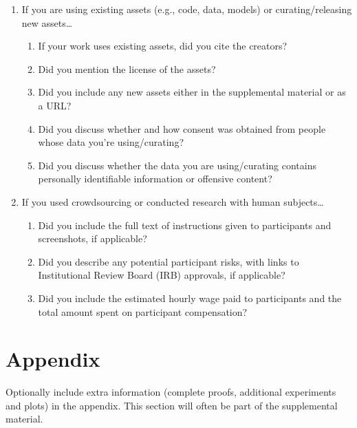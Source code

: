 \documentclass{article}
\begin{document}
\begin{enumerate}
\item If you are using existing assets (e.g., code, data, models) or
    curating/releasing new assets\ldots
\begin{enumerate}
  \item If your work uses existing assets, did you cite the creators?
    \answerTODO{}
  \item Did you mention the license of the assets?
    \answerTODO{}
  \item Did you include any new assets either in the supplemental material or
      as a URL\@?
    \answerTODO{}
  \item Did you discuss whether and how consent was obtained from people whose
      data you're using/curating?
    \answerTODO{}
  \item Did you discuss whether the data you are using/curating contains
      personally identifiable information or offensive content?
    \answerTODO{}
\end{enumerate}

\item If you used crowdsourcing or conducted research with human
    subjects\ldots
\begin{enumerate}
  \item Did you include the full text of instructions given to participants
      and screenshots, if applicable?
    \answerTODO{}
  \item Did you describe any potential participant risks, with links to
      Institutional Review Board (IRB) approvals, if applicable?
    \answerTODO{}
  \item Did you include the estimated hourly wage paid to participants and the
      total amount spent on participant compensation?
    \answerTODO{}
\end{enumerate}

\end{enumerate}

\appendix

\section{Appendix}

Optionally include extra information (complete proofs, additional experiments
and plots) in the appendix. This section will often be part of the
supplemental material.
\end{document}
